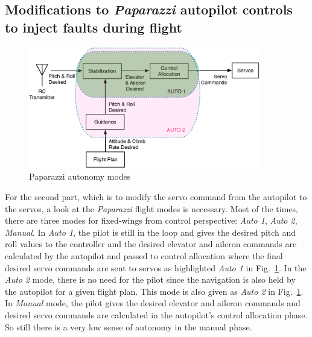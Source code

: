 \subsection{Modifications to \emph{Paparazzi} autopilot controls to inject faults during flight}

\begin{figure}
\begin{center}
\includegraphics[width=0.9\textwidth]{figures/pprzControlModes}    %
\caption{Paparazzi autonomy modes} 
\label{fig:paparazziControlModes}
\end{center}
\end{figure}


For the second part, which is to modify the servo command from the autopilot to the servos, a look at the \emph{Paparazzi} flight modes is necessary. 
Most of the times, there are three modes for fixed-wings from control perspective:  \emph{Auto 1},  \emph{Auto 2},  \emph{Manual}. 
In  \emph{Auto 1}, the pilot is still in the loop and gives the desired pitch and roll values to the controller and the desired elevator and aileron commands are calculated by the autopilot and passed to control allocation where the final desired servo commands are sent to servos as highlighted  \emph{Auto 1} in Fig.~\ref{fig:paparazziControlModes}. 
In the  \emph{Auto 2} mode, there is no need for the pilot since the navigation is also held by the autopilot for a given flight plan. 
This mode is also given as  \emph{Auto 2} in Fig.~\ref{fig:paparazziControlModes}.
In  \emph{Manual} mode, the pilot gives the desired elevator and aileron commands and desired servo commands are calculated in the autopilot's control allocation phase. So still there is a very low sense of autonomy in the manual phase. 


